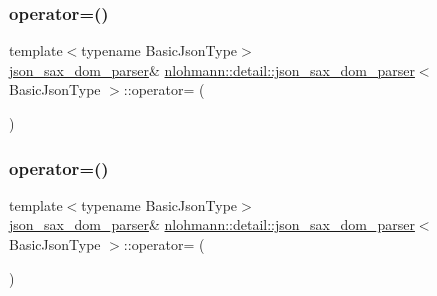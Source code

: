 \mbox{\label{classnlohmann_1_1detail_1_1json__sax__dom__parser_a98448bf2cbc15d15e2eddc5a09a40a42}} 
\subsubsection{\texorpdfstring{operator=()}{operator=()}\hspace{0.1cm}{\footnotesize\ttfamily [1/2]}}
{\footnotesize\ttfamily template$<$typename Basic\+Json\+Type$>$ \\
\hyperlink{classnlohmann_1_1detail_1_1json__sax__dom__parser}{json\+\_\+sax\+\_\+dom\+\_\+parser}\& \hyperlink{classnlohmann_1_1detail_1_1json__sax__dom__parser}{nlohmann\+::detail\+::json\+\_\+sax\+\_\+dom\+\_\+parser}$<$ Basic\+Json\+Type $>$\+::operator= (\begin{DoxyParamCaption}\item[{const \hyperlink{classnlohmann_1_1detail_1_1json__sax__dom__parser}{json\+\_\+sax\+\_\+dom\+\_\+parser}$<$ Basic\+Json\+Type $>$ \&}]{ }\end{DoxyParamCaption})\hspace{0.3cm}{\ttfamily [delete]}}

\mbox{\label{classnlohmann_1_1detail_1_1json__sax__dom__parser_aff928a07e40e4efb16b3ff9384f4401c}} 
\subsubsection{\texorpdfstring{operator=()}{operator=()}\hspace{0.1cm}{\footnotesize\ttfamily [2/2]}}
{\footnotesize\ttfamily template$<$typename Basic\+Json\+Type$>$ \\
\hyperlink{classnlohmann_1_1detail_1_1json__sax__dom__parser}{json\+\_\+sax\+\_\+dom\+\_\+parser}\& \hyperlink{classnlohmann_1_1detail_1_1json__sax__dom__parser}{nlohmann\+::detail\+::json\+\_\+sax\+\_\+dom\+\_\+parser}$<$ Basic\+Json\+Type $>$\+::operator= (\begin{DoxyParamCaption}\item[{\hyperlink{classnlohmann_1_1detail_1_1json__sax__dom__parser}{json\+\_\+sax\+\_\+dom\+\_\+parser}$<$ Basic\+Json\+Type $>$ \&\&}]{ }\end{DoxyParamCaption})\hspace{0.3cm}{\ttfamily [default]}}

